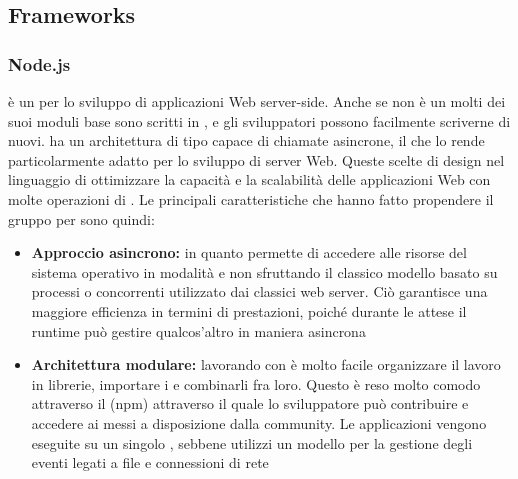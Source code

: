 \documentclass[12pt,a4paper]{article}
\begin{document}
\subsection{Frameworks}
\subsubsection{Node.js}\label{node.js}

 è un   per lo sviluppo di applicazioni Web server-side.
Anche se  non è un   molti dei suoi moduli base  sono scritti in , e gli sviluppatori possono facilmente scriverne di nuovi.
 ha un architettura di tipo  capace di chiamate  asincrone, il che lo rende particolarmente adatto per lo sviluppo di server Web.
Queste scelte di design nel linguaggio di ottimizzare la capacità e la scalabilità delle applicazioni Web con molte operazioni di .
Le principali caratteristiche che hanno fatto propendere il gruppo per  sono quindi:
\begin{itemize}
	\item \textbf{Approccio asincrono:} in quanto permette di accedere alle risorse del sistema operativo in modalità  e non sfruttando il classico modello basato su processi o  concorrenti utilizzato dai classici web server. Ciò garantisce una maggiore efficienza in termini di prestazioni, poiché durante le attese il runtime può gestire qualcos’altro in maniera asincrona
	
	\item \textbf{Architettura modulare:} lavorando con  è molto facile organizzare il lavoro in librerie, importare i  e combinarli fra loro. Questo è reso molto comodo attraverso il  (npm) attraverso il quale lo sviluppatore può contribuire e
	accedere ai  messi a disposizione dalla community.
	Le applicazioni  vengono eseguite su un singolo , sebbene  utilizzi un modello  per la gestione degli eventi legati a file e connessioni di rete
\end{itemize}
\end{document}
